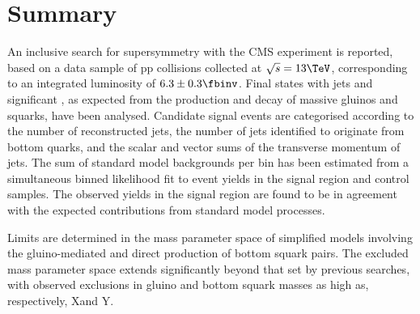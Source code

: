 \section{Summary}
\label{sec:summary}

An inclusive search for supersymmetry with the CMS experiment is
reported, based on a data sample of pp collisions collected at
$\sqrt{s} = 13\TeV$, corresponding to an integrated luminosity of $6.3
\pm 0.3 \fbinv$. Final states with jets and significant \ptvecmiss, as
expected from the production and decay of massive gluinos and squarks,
have been analysed. Candidate signal events are categorised according
to the number of reconstructed jets, the number of jets identified to
originate from bottom quarks, and the scalar and vector sums of the
transverse momentum of jets. The sum of standard model backgrounds per
bin has been estimated from a simultaneous binned likelihood fit to
event yields in the signal region and control samples. The observed
yields in the signal region are found to be in agreement with the
expected contributions from standard model processes. 

Limits are determined in the mass parameter space of simplified models
involving the gluino-mediated and direct production of bottom squark
pairs. The excluded mass parameter space extends significantly beyond
that set by previous searches, with observed exclusions in gluino and
bottom squark masses as high as, respectively, X\gev and Y\gev.

